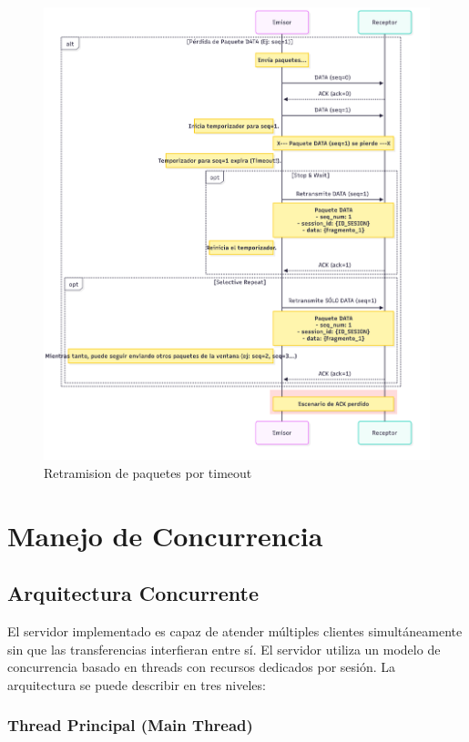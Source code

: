 \begin{figure}[H]
    \centering
    \includegraphics[width=1\linewidth]{images/RETRANSMISION}
    \caption{Retramision de paquetes por timeout}
    \label{fig:placeholder}
\end{figure}







\section{Manejo de Concurrencia}

\subsection{Arquitectura Concurrente}
El servidor implementado es capaz de atender múltiples clientes simultáneamente sin que las transferencias interfieran entre sí.
El servidor utiliza un modelo de concurrencia basado en threads con recursos dedicados por sesión. La arquitectura se puede describir en tres niveles:

\subsubsection{Thread Principal (Main Thread)}

